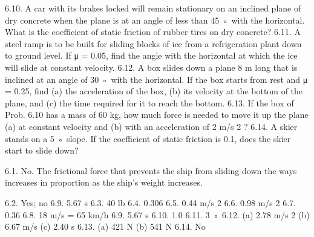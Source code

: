 6.10. A car with its brakes locked will remain stationary on an inclined plane of dry concrete when the plane is at an angle
of less than 45 ◦ with the horizontal. What is the coefficient of static friction of rubber tires on dry concrete?
6.11. A steel ramp is to be built for sliding blocks of ice from a refrigeration plant down to ground level. If μ = 0.05, find
the angle with the horizontal at which the ice will slide at constant velocity.
6.12. A box slides down a plane 8 m long that is inclined at an angle of 30 ◦ with the horizontal. If the box starts from rest
and μ = 0.25, find (a) the acceleration of the box, (b) its velocity at the bottom of the plane, and (c) the time required
for it to reach the bottom.
6.13. If the box of Prob. 6.10 has a mass of 60 kg, how much force is needed to move it up the plane (a) at constant velocity
and (b) with an acceleration of 2 m/s 2 ?
6.14. A skier stands on a 5 ◦ slope. If the coefficient of static friction is 0.1, does the skier start to slide down?

6.1. No. The frictional force that prevents the ship from sliding down the ways increases in proportion as the ship's weight increases.



6.2. Yes; no
6.9. 5.67 s
6.3. 40 lb
6.4. 0.306 
6.5. 0.44 m/s 2
6.6. 0.98 m/s 2
6.7. 0.36
6.8. 18 m/s = 65 km/h
6.9. 5.67 s
6.10. 1.0
6.11. 3 ◦
6.12. (a) 2.78 m/s 2 (b) 6.67 m/s (c) 2.40 s
6.13. (a) 421 N (b) 541 N
6.14. No



\endinput


